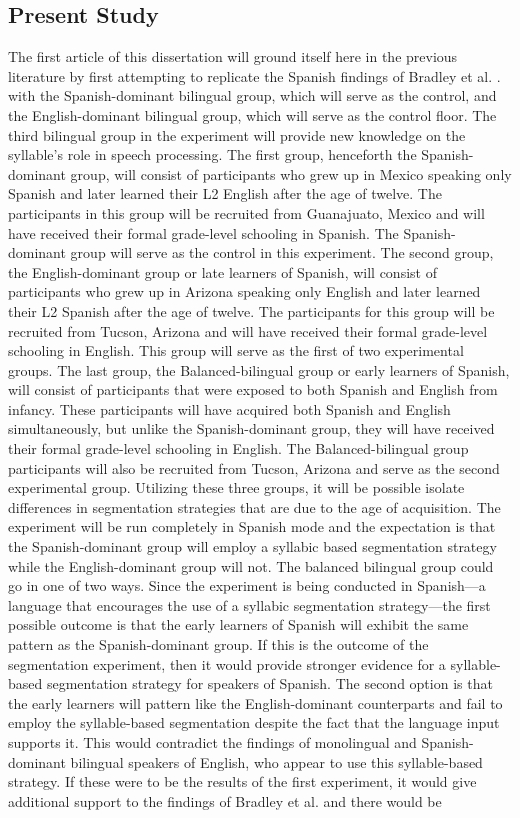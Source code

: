 \subsection{Present Study}
The first article of this dissertation will ground itself here in the previous literature by first attempting to replicate the Spanish findings of Bradley et al. \parencite*{Bradley1993-qq}. with the Spanish-dominant bilingual group, which will serve as the control, and the English-dominant bilingual group, which will serve as the control floor. The third bilingual group in the experiment will provide new knowledge on the syllable’s role in speech processing.  The first group, henceforth the Spanish-dominant group, will consist of participants who grew up in Mexico speaking only Spanish and later learned their L2 English after the age of twelve. The participants in this group will be recruited from Guanajuato, Mexico and will have received their formal grade-level schooling in Spanish. The Spanish-dominant group will serve as the control in this experiment. The second group, the English-dominant group or late learners of Spanish, will consist of participants who grew up in Arizona speaking only English and later learned their L2 Spanish after the age of twelve. The participants for this group will be recruited from Tucson, Arizona and will have received their formal grade-level schooling in English. This group will serve as the first of two experimental groups. The last group, the Balanced-bilingual group or early learners of Spanish, will consist of participants that were exposed to both Spanish and English from infancy. These participants will have acquired both Spanish and English simultaneously, but unlike the Spanish-dominant group, they will have received their formal grade-level schooling in English. The Balanced-bilingual group participants will also be recruited from Tucson, Arizona and serve as the second experimental group. Utilizing these three groups, it will be possible isolate differences in segmentation strategies that are due to the age of acquisition. The experiment will be run completely in Spanish mode and the expectation is that the Spanish-dominant group will employ a syllabic based segmentation strategy while the English-dominant group will not. The balanced bilingual group could go in one of two ways. Since the experiment is being conducted in Spanish—a language that encourages the use of a syllabic segmentation strategy—the first possible outcome is that the early learners of Spanish will exhibit the same pattern as the Spanish-dominant group. If this is the outcome of the segmentation experiment, then it would provide stronger evidence for a syllable-based segmentation strategy for speakers of Spanish. The second option is that the early learners will pattern like the English-dominant counterparts and fail to employ the syllable-based segmentation despite the fact that the language input supports it. This would contradict the findings of monolingual and Spanish-dominant bilingual speakers of English, who appear to use this syllable-based strategy. If these were to be the results of the first experiment, it would give additional support to the findings of Bradley et al. \parencite{Bradley1993-qq} and there would be 